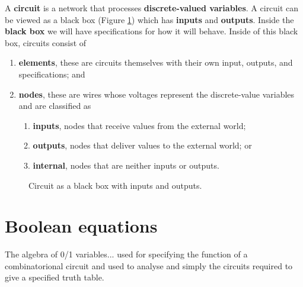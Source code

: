 \begin{definition}
    A \textbf{circuit} is a network that processes \textbf{discrete-valued variables}. A circuit can be viewed as a black box (Figure \ref{fig:black_box}) which has \textbf{inputs} and \textbf{outputs}. Inside the \textbf{black box} we will have specifications for how it will behave. Inside of this black box, circuits consist of
    \begin{enumerate}
        \item \textbf{elements}, these are circuits themselves with their own input, outputs, and specifications; and
        \item \textbf{nodes}, these are wires whose voltages represent the discrete-value variables and are classified as
        \begin{enumerate}
            \item \textbf{inputs}, nodes that receive values from the external world;
            \item \textbf{outputs}, nodes that deliver values to the external world; or
            \item \textbf{internal}, nodes that are neither inputs or outputs.
        \end{enumerate}
    \end{enumerate}
\end{definition}

\begin{figure}
    \centering
    \caption{Circuit as a black box with inputs and outputs.}
    \label{fig:black_box}
\end{figure}

\section{Boolean equations}

The algebra of 0/1 variables... used for specifying the function of a combinatorional circuit and used to analyse and simply the circuits required to give a specified truth table.

